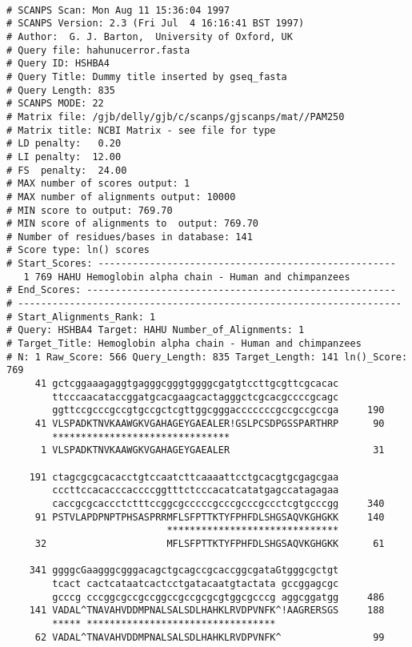\documentclass[12pt]{article}
\begin{document}
\begin{scriptsize}
\begin{verbatim}

# SCANPS Scan: Mon Aug 11 15:36:04 1997
# SCANPS Version: 2.3 (Fri Jul  4 16:16:41 BST 1997)
# Author:  G. J. Barton,  University of Oxford, UK
# Query file: hahunucerror.fasta
# Query ID: HSHBA4
# Query Title: Dummy title inserted by gseq_fasta                              
# Query Length: 835
# SCANPS MODE: 22
# Matrix file: /gjb/delly/gjb/c/scanps/gjscanps/mat//PAM250
# Matrix title: NCBI Matrix - see file for type
# LD penalty:   0.20
# LI penalty:  12.00
# FS  penalty:  24.00
# MAX number of scores output: 1
# MAX number of alignments output: 10000
# MIN score to output: 769.70
# MIN score of alignments to  output: 769.70
# Number of residues/bases in database: 141
# Score type: ln() scores
# Start_Scores: ----------------------------------------------------
   1 769 HAHU Hemoglobin alpha chain - Human and chimpanzees    
# End_Scores: ------------------------------------------------------
# -------------------------------------------------------------------
# Start_Alignments_Rank: 1
# Query: HSHBA4 Target: HAHU Number_of_Alignments: 1
# Target_Title: Hemoglobin alpha chain - Human and chimpanzees                                                                                                                                                          
# N: 1 Raw_Score: 566 Query_Length: 835 Target_Length: 141 ln()_Score: 769
     41 gctcggaaagaggtgagggcgggtggggcgatgtccttgcgttcgcacac
        ttcccaacataccggatgcacgaagcactagggctcgcacgccccgcagc
        ggttccgcccgccgtgccgctcgttggcgggacccccccgccgccgccga     190
     41 VLSPADKTNVKAAWGKVGAHAGEYGAEALER!GSLPCSDPGSSPARTHRP      90
        *******************************                   
      1 VLSPADKTNVKAAWGKVGAHAGEYGAEALER                         31

    191 ctagcgcgcacacctgtccaatcttcaaaattcctgcacgtgcgagcgaa
        cccttccacacccaccccggtttctcccacatcatatgagccatagagaa
        caccgcgcaccctctttccggcgcccccgcccgcccgccctcgtgcccgg     340
     91 PSTVLAPDPNPTPHSASPRRMFLSFPTTKTYFPHFDLSHGSAQVKGHGKK     140
                            ******************************
     32                     MFLSFPTTKTYFPHFDLSHGSAQVKGHGKK      61

    341 ggggcGaagggcgggacagctgcagccgcaccggcgataGtgggcgctgt
        tcact cactcataatcactcctgatacaatgtactata gccggagcgc
        gcccg cccggcgccgccggccgccgcgcgtggcgcccg aggcggatgg     486
    141 VADAL^TNAVAHVDDMPNALSALSDLHAHKLRVDPVNFK^!AAGRERSGS     188
        ***** *********************************           
     62 VADAL^TNAVAHVDDMPNALSALSDLHAHKLRVDPVNFK^                99


\end{verbatim}
\end{scriptsize}
\end{document}
